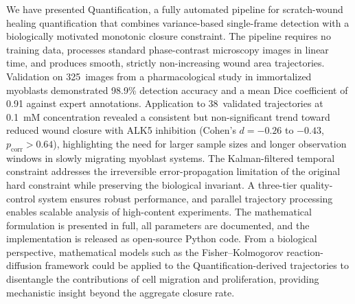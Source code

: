 We have presented Quantification, a fully automated pipeline for scratch-wound healing quantification that combines variance-based single-frame detection with a biologically motivated monotonic closure constraint. The pipeline requires no training data, processes standard phase-contrast microscopy images in linear time, and produces smooth, strictly non-increasing wound area trajectories. Validation on 325~images from a pharmacological study in immortalized myoblasts demonstrated 98.9\% detection accuracy and a mean Dice coefficient of 0.91 against expert annotations. Application to 38~validated trajectories at 0.1~mM concentration revealed a consistent but non-significant trend toward reduced wound closure with ALK5 inhibition (Cohen's $d = -0.26$ to $-0.43$, $p_\text{corr} > 0.64$), highlighting the need for larger sample sizes and longer observation windows in slowly migrating myoblast systems. The Kalman-filtered temporal constraint addresses the irreversible error-propagation limitation of the original hard constraint while preserving the biological invariant. A three-tier quality-control system ensures robust performance, and parallel trajectory processing enables scalable analysis of high-content experiments. The mathematical formulation is presented in full, all parameters are documented, and the implementation is released as open-source Python code. From a biological perspective, mathematical models such as the Fisher--Kolmogorov reaction-diffusion framework \citep{Jin2015,Maini2020,Simpson2013} could be applied to the Quantification-derived trajectories to disentangle the contributions of cell migration and proliferation, providing mechanistic insight beyond the aggregate closure rate.
